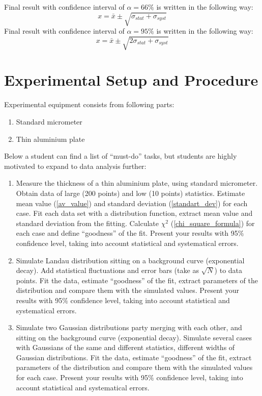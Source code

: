 \documentclass[12pt,a4paper]{report}
\begin{document}
Final result with confidence interval of $\alpha = 66 \%$ is written in the following way:
\begin{equation}
x = \bar{x} \pm \sqrt{\sigma_{stat}+\sigma_{syst}}
\end{equation}
Final result with confidence interval of $\alpha = 95 \%$ is written in the following way:
\begin{equation} \label{error_offline}
x = \bar{x} \pm \sqrt{2\sigma_{stat}+\sigma_{syst}}
\end{equation}



\section{Experimental Setup and Procedure}
Experimental equipment consists from following parts:
\begin{enumerate}
\item Standard micrometer
\item Thin aluminium plate
\end{enumerate}
Below a student can find a list of \enquote{must-do} tasks, but students are highly motivated to expand to data analysis further:

\begin{enumerate}
\item Measure the thickness of a thin aluminium plate, using standard micrometer. Obtain data of large (200 points) and low (10 points) statistics. Estimate mean value (\ref{av_value}) and standard deviation (\ref{standart_dev}) for each case. Fit each data set with a distribution function, extract mean value and standard deviation from the fitting. Calculate $\chi^2$ (\ref{chi_square_formula}) for each case and define \enquote{goodness} of the fit. Present your results with 95$\%$ confidence level, taking into account statistical and systematical errors. 
\item Simulate Landau distribution sitting on a background curve (exponential decay). Add statistical fluctuations and error bars (take as $\sqrt{N}$) to data points. Fit the data, estimate \enquote{goodness} of the fit, extract parameters of the distribution and compare them with the simulated values. Present your results with 95$\%$ confidence level, taking into account statistical and systematical errors.
\item Simulate two Gaussian distributions party merging with each other, and sitting on the background curve (exponential decay). Simulate several cases with Gaussians of the same and different statistics, different widths of Gaussian distributions. Fit the data, estimate \enquote{goodness} of the fit, extract parameters of the distribution and compare them with the simulated values for each case. Present your results with 95$\%$ confidence level, taking into account statistical and systematical errors.
\end{enumerate}
\end{document}
